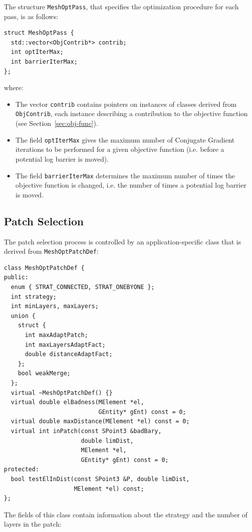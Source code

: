 \documentclass[12pt,a4paper,a4wide]{article}
\begin{document}
The structure \texttt{MeshOptPass}, that specifies the optimization
procedure for each pass, is as follows:

\begin{verbatim}
struct MeshOptPass {
  std::vector<ObjContrib*> contrib;
  int optIterMax;
  int barrierIterMax;
};
\end{verbatim}

where:

\begin{itemize}
\item The vector \texttt{contrib} contains pointers on instances
of classes derived from \texttt{ObjContrib}, each instance
describing a contribution to the objective function (see
Section~\ref{sec:obj-func}).
\item The field \texttt{optIterMax} gives the maximum number of
Conjugate Gradient iterations to be performed for a given objective
function (i.e. before a potential log barrier is moved).
\item The field \texttt{barrierIterMax} determines the maximum
number of times the objective function is changed, i.e. the number
of times a potential log barrier is moved.
\end{itemize}


\subsection{Patch Selection}\label{sec:patch-selec}

The patch selection process is controlled by an application-specific
class that is derived from \texttt{MeshOptPatchDef}:

\begin{verbatim}
class MeshOptPatchDef {
public:
  enum { STRAT_CONNECTED, STRAT_ONEBYONE };
  int strategy;
  int minLayers, maxLayers;
  union {
    struct {
      int maxAdaptPatch;
      int maxLayersAdaptFact;
      double distanceAdaptFact;
    };
    bool weakMerge;
  };
  virtual ~MeshOptPatchDef() {}
  virtual double elBadness(MElement *el,
                           GEntity* gEnt) const = 0;
  virtual double maxDistance(MElement *el) const = 0;
  virtual int inPatch(const SPoint3 &badBary,
                      double limDist,
                      MElement *el,
                      GEntity* gEnt) const = 0;
protected:
  bool testElInDist(const SPoint3 &P, double limDist,
                    MElement *el) const;
};
\end{verbatim}

The fields of this class contain information about the strategy
and the number of layers in the patch:
\end{document}
